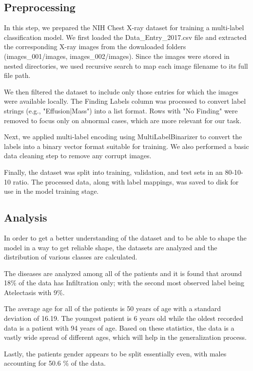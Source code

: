 \documentclass{article}
\begin{document}
\subsection{Preprocessing}
In this step, we prepared the NIH Chest X-ray dataset for training a multi-label classification model. We first loaded the Data\_Entry\_2017.csv file and extracted the corresponding X-ray images from the downloaded folders (images\_001/images, images\_002/images). Since the images were stored in nested directories, we used recursive search to map each image filename to its full file path.

We then filtered the dataset to include only those entries for which the images were available locally. The Finding Labels column was processed to convert label strings (e.g., "Effusion|Mass") into a list format. Rows with "No Finding" were removed to focus only on abnormal cases, which are more relevant for our task.

Next, we applied multi-label encoding using MultiLabelBinarizer to convert the labels into a binary vector format suitable for training. We also performed a basic data cleaning step to remove any corrupt images.

Finally, the dataset was split into training, validation, and test sets in an 80-10-10 ratio. The processed data, along with label mappings, was saved to disk for use in the model training stage.

\subsection{Analysis}
In order to get a better understanding of the dataset and to be able to shape the model in a way to get reliable shape, the datasets are analyzed and the distribution of various classes are calculated.

The diseases are analyzed among all of the patients and it is found that around 18\% of the data has Infiltration only; with the second most observed label being Atelectasis with 9\%.

The average age for all of the patients is 50 years of age with a standard deviation of 16.19. The youngest patient is 6 years old while the oldest recorded data is a patient with 94 years of age. Based on these statistics, the data is a vastly wide spread of different ages, which will help in the generalization process.

Lastly, the patients gender appears to be split essentially even, with males accounting for 50.6 \% of the data.
\end{document}
